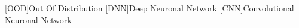 \begin{acronym}[IEEE]
	[OOD]{Out Of Distribution}
	[DNN]{Deep Neuronal Network}
	[CNN]{Convolutional Neuronal Network}
\end{acronym}
